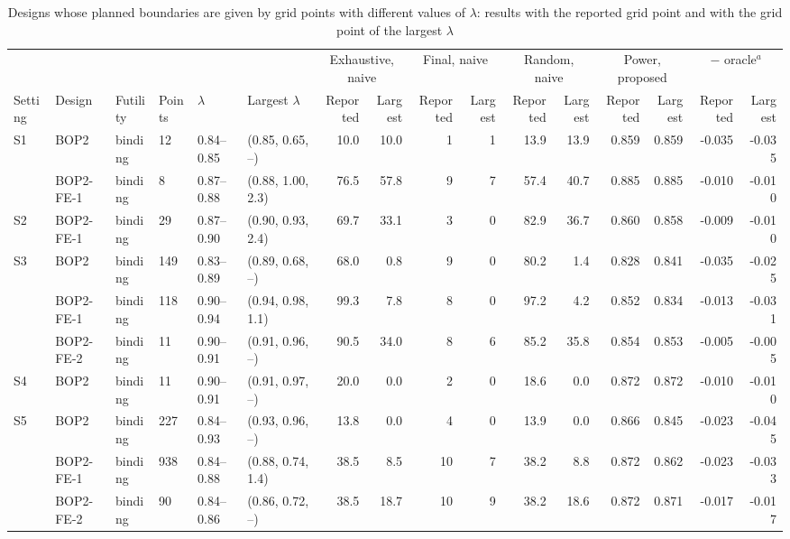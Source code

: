 \begin{table}
\centering
\caption{Designs whose planned boundaries are given by grid points with different values of $\lambda$: results with the reported grid point and with the grid point of the largest $\lambda$}
\label{tab:equivalent}
\scriptsize
\setlength{\tabcolsep}{3pt}
\begin{tabular}{llllllrrrrrrrrrr}
\toprule
 & & & & & & \multicolumn{2}{c}{Exhaustive, naive} & \multicolumn{2}{c}{Final, naive} & \multicolumn{2}{c}{Random, naive} & \multicolumn{2}{c}{Power, proposed} & \multicolumn{2}{c}{$-$ oracle$^{a}$} \\
\cmidrule(lr){7-8}\cmidrule(lr){9-10}\cmidrule(lr){11-12}\cmidrule(lr){13-14}\cmidrule(lr){15-16}
Setting & Design & Futility & Points & $\lambda$ & Largest $\lambda$ & Reported & Largest & Reported & Largest & Reported & Largest & Reported & Largest & Reported & Largest \\
\midrule
S1 & BOP2 & binding & 12 & 0.84--0.85 & (0.85, 0.65, --) & 10.0 & 10.0 & 1 & 1 & 13.9 & 13.9 & 0.859 & 0.859 & -0.035 & -0.035 \\
 & BOP2-FE-1 & binding & 8 & 0.87--0.88 & (0.88, 1.00, 2.3) & 76.5 & 57.8 & 9 & 7 & 57.4 & 40.7 & 0.885 & 0.885 & -0.010 & -0.010 \\
\midrule
S2 & BOP2-FE-1 & binding & 29 & 0.87--0.90 & (0.90, 0.93, 2.4) & 69.7 & 33.1 & 3 & 0 & 82.9 & 36.7 & 0.860 & 0.858 & -0.009 & -0.010 \\
\midrule
S3 & BOP2 & binding & 149 & 0.83--0.89 & (0.89, 0.68, --) & 68.0 & 0.8 & 9 & 0 & 80.2 & 1.4 & 0.828 & 0.841 & -0.035 & -0.025 \\
 & BOP2-FE-1 & binding & 118 & 0.90--0.94 & (0.94, 0.98, 1.1) & 99.3 & 7.8 & 8 & 0 & 97.2 & 4.2 & 0.852 & 0.834 & -0.013 & -0.031 \\
 & BOP2-FE-2 & binding & 11 & 0.90--0.91 & (0.91, 0.96, --) & 90.5 & 34.0 & 8 & 6 & 85.2 & 35.8 & 0.854 & 0.853 & -0.005 & -0.005 \\
\midrule
S4 & BOP2 & binding & 11 & 0.90--0.91 & (0.91, 0.97, --) & 20.0 & 0.0 & 2 & 0 & 18.6 & 0.0 & 0.872 & 0.872 & -0.010 & -0.010 \\
\midrule
S5 & BOP2 & binding & 227 & 0.84--0.93 & (0.93, 0.96, --) & 13.8 & 0.0 & 4 & 0 & 13.9 & 0.0 & 0.866 & 0.845 & -0.023 & -0.045 \\
 & BOP2-FE-1 & binding & 938 & 0.84--0.88 & (0.88, 0.74, 1.4) & 38.5 & 8.5 & 10 & 7 & 38.2 & 8.8 & 0.872 & 0.862 & -0.023 & -0.033 \\
 & BOP2-FE-2 & binding & 90 & 0.84--0.86 & (0.86, 0.72, --) & 38.5 & 18.7 & 10 & 9 & 38.2 & 18.6 & 0.872 & 0.871 & -0.017 & -0.017 \\

\end{tabular}
\end{table}
